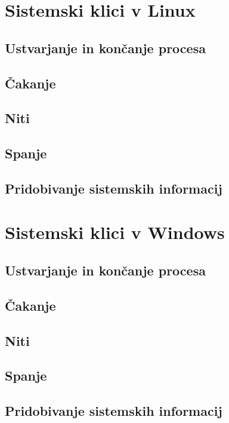 \documentclass[a4paper,12pt,openright]{book}
\begin{document}
\section{Sistemski klici v Linux}

\subsection{Ustvarjanje in končanje procesa}

\subsection{Čakanje}

\subsection{Niti}

\subsection{Spanje}

\subsection{Pridobivanje sistemskih informacij}

\section{Sistemski klici v Windows}

\subsection{Ustvarjanje in končanje procesa}

\subsection{Čakanje}

\subsection{Niti}

\subsection{Spanje}

\subsection{Pridobivanje sistemskih informacij}
\end{document}
